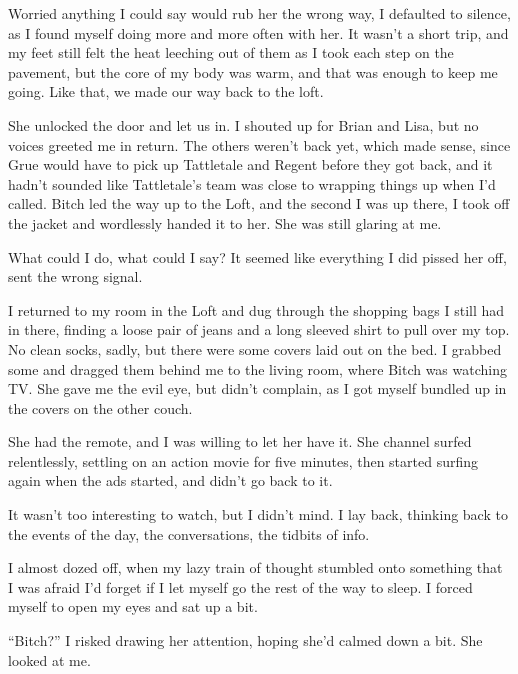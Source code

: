 Worried anything I could say would rub her the wrong way, I defaulted to silence, as I found myself doing more and more often with her.  It wasn't a short trip, and my feet still felt the heat leeching out of them as I took each step on the pavement, but the core of my body was warm, and that was enough to keep me going.  Like that, we made our way back to the loft.



She unlocked the door and let us in.  I shouted up for Brian and Lisa, but no voices greeted me in return.  The others weren't back yet, which made sense, since Grue would have to pick up Tattletale and Regent before they got back, and it hadn't sounded like Tattletale's team was close to wrapping things up when I'd called.  Bitch led the way up to the Loft, and the second I was up there, I took off the jacket and wordlessly handed it to her.  She was still glaring at me.



What could I do, what could I say?  It seemed like everything I did pissed her off, sent the wrong signal.



I returned to my room in the Loft and dug through the shopping bags I still had in there, finding a loose pair of jeans and a long sleeved shirt to pull over my top.  No clean socks, sadly, but there were some covers laid out on the bed.  I grabbed some and dragged them behind me to the living room, where Bitch was watching TV.  She gave me the evil eye, but didn't complain, as I got myself bundled up in the covers on the other couch.



She had the remote, and I was willing to let her have it.  She channel surfed relentlessly, settling on an action movie for five minutes, then started surfing again when the ads started, and didn't go back to it.



It wasn't too interesting to watch, but I didn't mind.  I lay back, thinking back to the events of the day, the conversations, the tidbits of info.



I almost dozed off, when my lazy train of thought stumbled onto something that I was afraid I'd forget if I let myself go the rest of the way to sleep.  I forced myself to open my eyes and sat up a bit.



``Bitch?'' I risked drawing her attention, hoping she'd calmed down a bit.  She looked at me.



